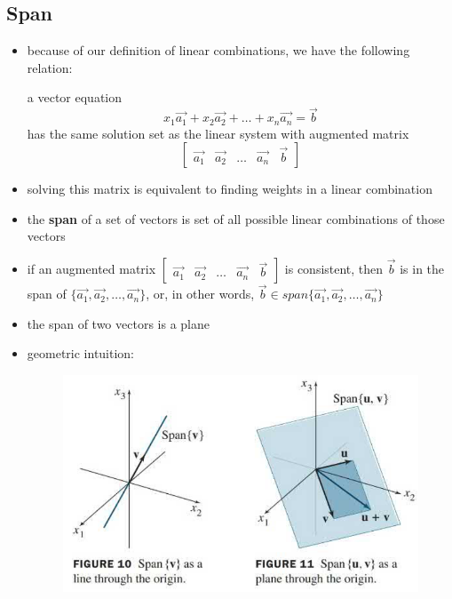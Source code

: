\documentclass[a4paper,12pt]{article}
\theoremstyle{definition}
\theoremstyle{definition}
\begin{document}
	\subsection{Span}
	\begin{itemize}
		\item because of our definition of linear combinations, we have the following relation:
		
		a vector equation
		\begin{equation*}
			x_1\vec{a_1} + x_2\vec{a_2} + \ldots + x_n\vec{a_n} = \vec{b}
		\end{equation*}
		has the same solution set as the linear system with augmented matrix
		\begin{equation*}
			\begin{bmatrix}
				\vec{a_1} & \vec{a_2} & \ldots & \vec{a_n} & \vec{b}
			\end{bmatrix}
		\end{equation*}
		
		\item solving this matrix is equivalent to finding weights in a linear combination
		
		\item the \textbf{span} of a set of vectors is set of all possible linear combinations of those vectors
		
		\item if an augmented matrix $\begin{bmatrix}
			\vec{a_1} & \vec{a_2} & \ldots & \vec{a_n} & \vec{b}
		\end{bmatrix}$
		is consistent, then $\vec{b}$ is in the span of $\{\vec{a_1}, \vec{a_2}, \ldots, \vec{a_n}\}$, or, in other words, $\vec{b} \in span\{\vec{a_1}, \vec{a_2}, \ldots, \vec{a_n}\}$
		
		\item the span of two vectors is a plane
		
		\item geometric intuition:
		
		\begin{figure}[h!]
			\includegraphics[width=0.5\paperwidth, center]{images/span.PNG}
		\end{figure}
	\end{itemize}
	
\end{document}
